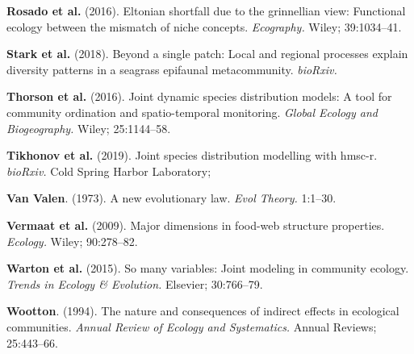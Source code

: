 \documentclass[
  12pt,
  a4paper,
  oneside]{report}
\begin{document}
\leavevmode\hypertarget{ref-Rosado_2016}{}%
\textbf{Rosado et al.} (2016). Eltonian shortfall due to the grinnellian
view: Functional ecology between the mismatch of niche concepts.
\emph{Ecography.} Wiley; 39:1034--41.

\leavevmode\hypertarget{ref-Stark_2018}{}%
\textbf{Stark et al.} (2018). Beyond a single patch: Local and regional
processes explain diversity patterns in a seagrass epifaunal
metacommunity. \emph{bioRxiv.}

\leavevmode\hypertarget{ref-Thorson_2016}{}%
\textbf{Thorson et al.} (2016). Joint dynamic species distribution
models: A tool for community ordination and spatio-temporal monitoring.
\emph{Global Ecology and Biogeography.} Wiley; 25:1144--58.

\leavevmode\hypertarget{ref-Tikhonov_2019}{}%
\textbf{Tikhonov et al.} (2019). Joint species distribution modelling
with hmsc-r. \emph{bioRxiv.} Cold Spring Harbor Laboratory;

\leavevmode\hypertarget{ref-Van_Valen_1973}{}%
\textbf{Van Valen}. (1973). A new evolutionary law. \emph{Evol Theory.}
1:1--30.

\leavevmode\hypertarget{ref-Vermaat_2009}{}%
\textbf{Vermaat et al.} (2009). Major dimensions in food-web structure
properties. \emph{Ecology.} Wiley; 90:278--82.

\leavevmode\hypertarget{ref-Warton_2015}{}%
\textbf{Warton et al.} (2015). So many variables: Joint modeling in
community ecology. \emph{Trends in Ecology \& Evolution.} Elsevier;
30:766--79.

\leavevmode\hypertarget{ref-Wootton_1994}{}%
\textbf{Wootton}. (1994). The nature and consequences of indirect
effects in ecological communities. \emph{Annual Review of Ecology and
Systematics.} Annual Reviews; 25:443--66.
\end{document}
